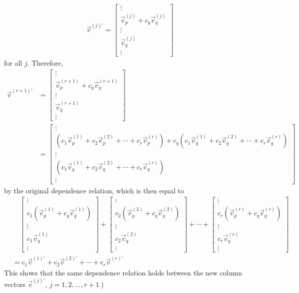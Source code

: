 {\begin{align*}
\vec{v}^{(j)'}
=
\begin{bmatrix}
\vdots \\
\vec{v}_p^{(j)} + c_q\vec{v}_q^{(j)} \\
\vdots \\
\vec{v}_q^{(j)} \\
\vdots
\end{bmatrix}
\end{align*}
for all $j$. Therefore,
\begin{align*}
\vec{v}^{(r+1)'} &= \begin{bmatrix}
\vdots \\
\vec{v}_p^{(r+1)} + c_q\vec{v}_q^{(r+1)} \\
\vdots \\
\vec{v}_q^{(r+1)} \\
\vdots
\end{bmatrix} \\
&=
\begin{bmatrix}
\vdots \\
(c_1\vec{v}_p^{(1)} + c_2\vec{v}_p^{(2)} + \cdots + c_r\vec{v}_p^{(r)}) + c_q(c_1\vec{v}_q^{(1)} + c_2\vec{v}_q^{(2)} + \cdots + c_r\vec{v}_q^{(r)}) \\
\vdots \\
(c_1\vec{v}_q^{(1)} + c_2\vec{v}_q^{(2)} + \cdots + c_r\vec{v}_q^{(r)}) \\
\vdots
\end{bmatrix}  
\end{align*}
by the original dependence relation, which is then equal to
\begin{align*}
&\quad \begin{bmatrix}
\vdots \\
c_1(\vec{v}_p^{(1)} + c_q\vec{v}_q^{(1)}) \\
\vdots \\
c_1\vec{v}_q^{(1)} \\
\vdots
\end{bmatrix}
+
\begin{bmatrix}
\vdots \\
c_2(\vec{v}_p^{(2)} + c_q\vec{v}_q^{(2)}) \\
\vdots \\
c_2\vec{v}_q^{(2)} \\
\vdots
\end{bmatrix} 
+ \cdots +
\begin{bmatrix}
\vdots \\
c_r(\vec{v}_p^{(r)} + c_q\vec{v}_q^{(r)}) \\
\vdots \\
c_r\vec{v}_q^{(r)} \\
\vdots
\end{bmatrix} \\
&= c_1\vec{v}^{(1)'} + c_2\vec{v}^{(2)'} + \cdots + c_r\vec{v}^{(r)'}
\end{align*}
This shows that the same dependence relation holds between the new column vectors $\vec{v}^{(j)'}$, $j = 1,2,\ldots,r+1$.})

